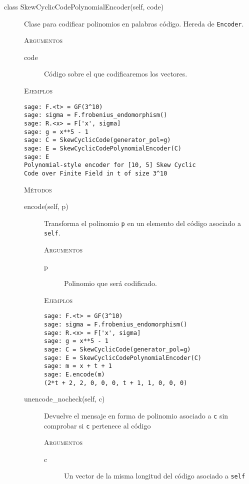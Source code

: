 \begin{description}
    \item[class SkewCyclicCodePolynomialEncoder(self, code)]
    Clase para codificar polinomios en palabras código. Hereda de \texttt{Encoder}.

    \textsc{Argumentos}
    \begin{description}
        \item[code]
        Código sobre el que codificaremos los vectores.
    \end{description}

    \textsc{Ejemplos}
    \begin{lstlisting}
sage: F.<t> = GF(3^10)
sage: sigma = F.frobenius_endomorphism()
sage: R.<x> = F['x', sigma]
sage: g = x**5 - 1
sage: C = SkewCyclicCode(generator_pol=g)
sage: E = SkewCyclicCodePolynomialEncoder(C)
sage: E
Polynomial-style encoder for [10, 5] Skew Cyclic
Code over Finite Field in t of size 3^10
    \end{lstlisting}

    \textsc{Métodos}
    \begin{description}
        \item[encode(self, p)]
        Transforma el polinomio \texttt{p} en un elemento del código asociado a \texttt{self}.

        \textsc{Argumentos}
        \begin{description}
            \item[p]
            Polinomio que será codificado.
        \end{description}

        \textsc{Ejemplos}
        \begin{lstlisting}
sage: F.<t> = GF(3^10)
sage: sigma = F.frobenius_endomorphism()
sage: R.<x> = F['x', sigma]
sage: g = x**5 - 1
sage: C = SkewCyclicCode(generator_pol=g)
sage: E = SkewCyclicCodePolynomialEncoder(C)
sage: m = x + t + 1
sage: E.encode(m)
(2*t + 2, 2, 0, 0, 0, t + 1, 1, 0, 0, 0)
        \end{lstlisting}

        \item[unencode\_nocheck(self, c)]
        Devuelve el mensaje en forma de polinomio asociado a \texttt{c} sin comprobar si \texttt{c} pertenece al código

        \textsc{Argumentos}
        \begin{description}
            \item[c]
            Un vector de la misma longitud del código asociado a \texttt{self}
        \end{description}


\end{description}
\end{description}
